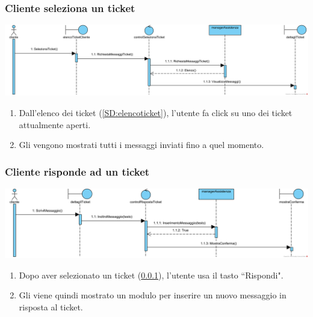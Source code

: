 \documentclass[12pt,a4paper]{article}
\begin{document}
\subsubsection{Cliente seleziona un ticket}
\label{SD:selezioneticketcliente}

\begin{center}
\includegraphics[width=\textwidth]{SequenceDiagram/ClienteTicketSeleziona}
\end{center}

\begin{enumerate}
\item Dall'elenco dei ticket (\ref{SD:elencoticket}), l'utente fa click su uno dei ticket attualmente aperti.
\item Gli vengono mostrati tutti i messaggi inviati fino a quel momento.
\end{enumerate}

\newpage

\subsubsection{Cliente risponde ad un ticket}
\label{SD:rispostaticketcliente}

\begin{center}
\includegraphics[width=\textwidth]{SequenceDiagram/ClienteTicketRisponde}
\end{center}

\begin{enumerate}
\item Dopo aver selezionato un ticket (\ref{SD:selezioneticketcliente}), l'utente usa il tasto ``Rispondi".
\item Gli viene quindi mostrato un modulo per inserire un nuovo messaggio in risposta al ticket.
\end{enumerate}
\end{document}
